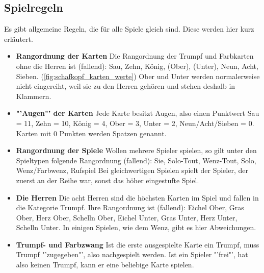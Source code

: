 \documentclass[
							a4paper, 
							11pt, 
							openany, 
							liststotoc,
							parskip=half, 
   							headings=normal
						]{scrreprt}
\begin{document}
{\clearpage

\subsection{Spielregeln} \label{sse:grundlagen_schafkopf_regeln_allgemein} 
Es gibt allgemeine Regeln, die für alle Spiele gleich sind. Diese werden hier kurz erläutert.
\begin{itemize}
	\item \textbf{Rangordnung der Karten}\newline
Die Rangordnung der Trumpf und Farbkarten ohne die Herren ist (fallend):\newline
Sau, Zehn, König, (Ober), (Unter), Neun, Acht, Sieben.\newline
(\autoref{fig:schafkopf_karten_werte})\newline
Ober und Unter werden normalerweise nicht eingereiht, weil sie zu den Herren gehören und stehen deshalb in Klammern.
	\item \textbf{"'Augen"' der Karten}\newline
Jede Karte besitzt Augen, also einen Punktwert\newline
Sau = 11, Zehn = 10, König = 4, Ober = 3, Unter = 2, Neun/Acht/Sieben = 0.\newline
Karten mit 0 Punkten werden Spatzen genannt.
	\item \textbf{Rangordnung der Spiele}\newline
Wollen mehrere Spieler spielen, so gilt unter den Spieltypen folgende Rangordnung (fallend):\newline
Sie, Solo-Tout, Wenz-Tout, Solo, Wenz/Farbwenz, Rufspiel\newline
Bei gleichwertigen Spielen spielt der Spieler, der zuerst an der Reihe war, sonst das höher eingestufte Spiel.
	\item \textbf{Die Herren}\newline
Die acht Herren sind die höchsten Karten im Spiel und fallen in die Kategorie Trumpf. Ihre Rangordnung ist (fallend):\newline
Eichel Ober, Gras Ober, Herz Ober, Schelln Ober, \newline
Eichel Unter, Gras Unter, Herz Unter, Schelln Unter.\newline
In einigen Spielen, wie dem Wenz, gibt es hier Abweichungen.
\item \textbf{Trumpf- und Farbzwang}\newline
Ist die erste ausgespielte Karte ein Trumpf, muss Trumpf "'zugegeben"', also nachgespielt werden. Ist ein Spieler "'frei"', hat also keinen Trumpf, kann er eine beliebige Karte spielen.\newline

\end{itemize}}
\end{document}

